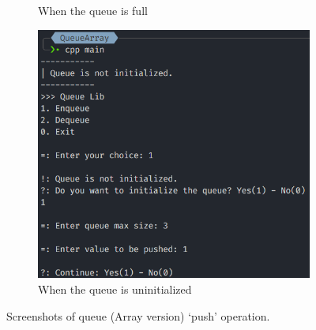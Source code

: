 \begin{figure}[!ht]
\begin{subfigure}{0.59\textwidth}
		\caption{When the queue is full}\label{fig:queue_arr_push_full}
	\end{subfigure}
	\hfill
	\begin{subfigure}{0.75\textwidth}
		\centering
		\includegraphics[width=\textwidth]{imgs/QueueArray/push/empty.png}
		\caption{When the queue is uninitialized}\label{fig:queue_arr_push_empty}
	\end{subfigure}
	\caption{Screenshots of queue (Array version) `push' operation.}\label{fig:queue_arr_push_cases}
\end{figure}
